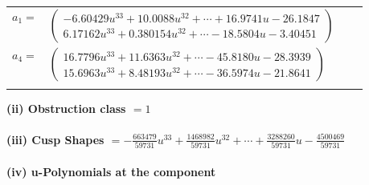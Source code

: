 \documentclass[1p]{elsarticle_modified}
\theoremstyle{definition}
\begin{document}
\begin{tabular}{m{7pt} m{180pt} m{7pt} m{180pt} }
\flushright $a_{1}=$&$\begin{pmatrix}-6.60429 u^{33}+10.0088 u^{32}+\cdots+16.9741 u-26.1847\\6.17162 u^{33}+0.380154 u^{32}+\cdots-18.5804 u-3.40451\end{pmatrix}$ \\
\flushright $a_{4}=$&$\begin{pmatrix}16.7796 u^{33}+11.6363 u^{32}+\cdots-45.8180 u-28.3939\\15.6963 u^{33}+8.48193 u^{32}+\cdots-36.5974 u-21.8641\end{pmatrix}$\\&\end{tabular}
\flushleft \textbf{(ii) Obstruction class $= 1$}\\~\\
\flushleft \textbf{(iii) Cusp Shapes $= -\frac{663479}{59731} u^{33}+\frac{1468982}{59731} u^{32}+\cdots+\frac{3288260}{59731} u-\frac{4500469}{59731}$}\\~\\
\newpage\renewcommand{\arraystretch}{1}
\flushleft \textbf{(iv) u-Polynomials at the component}\newline \\
\end{document}
